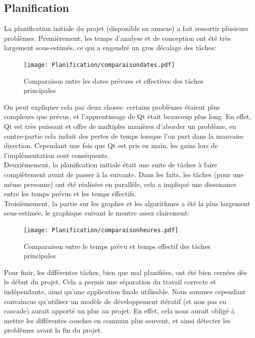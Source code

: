 \documentclass[french]{article}
\begin{document}
		\subsection{Planification}
		
		La planification initiale du projet (disponible en annexe) a fait ressortir plusieurs problèmes. Premièrement, les temps d'analyse et de conception ont été très largement sous-estimés, ce qui a engendré un gros décalage des tâches:
		\begin{figure}[H]
			\texttt{[image: Planification/comparaisondates.pdf]}
			\caption{Comparaison entre les dates prévues et effectives des tâches principales}
			\label{fig:comparaisondates}
		\end{figure}
		On peut expliquer cela par deux choses: certains problèmes étaient plus complexes que prévus, et l'apprentissage de Qt était beaucoup plus long. En effet, Qt est très puissant et offre de multiples manières d'aborder un problème, en contre-partie cela induit des pertes de temps lorsque l'on part dans la mauvaise direction. Cependant une fois que Qt est pris en main, les gains lors de l'implémentation sont conséquents.\\ 
		
		Deuxièmement, la planification initiale était une suite de tâches à faire complètement avant de passer à la suivante. Dans les faits, les tâches (pour une même personne) ont été réalisées en parallèle, cela a impliqué une dissonance entre les temps prévus et les temps effectifs.\\
		
		Troisièmement, la partie sur les graphes et les algorithmes a été la plus largement sous-estimée, le graphique suivant le montre assez clairement:
		\begin{figure}[H]
			\texttt{[image: Planification/comparaisonheures.pdf]}
			\caption{Comparaison entre le temps prévu et temps effectif des tâches
				principales}
			\label{fig:comparaisonheures}
		\end{figure}
		
		Pour finir, les différentes tâches, bien que mal planifiées, ont été bien cernées dès le début du projet. Cela a permis une séparation du travail correcte et indépendante, ainsi qu'une application finale utilisable. Nous sommes cependant convaincus qu'utiliser un modèle de développement itératif (et non pas en cascade) aurait apporté un plus au projet. En effet, cela nous aurait obligé à mettre les différentes couches en commun plus souvent, et ainsi détecter les problèmes avant la fin du projet. 
		
\end{document}
